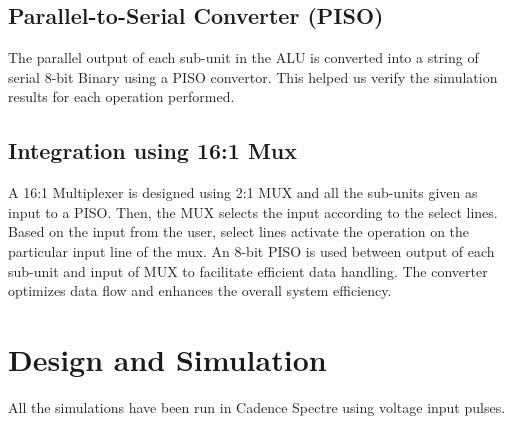 \documentclass[conference]{IEEEtran}
\begin{document}
\subsection{Parallel-to-Serial Converter (PISO)}\label{CC}
The parallel output of each sub-unit in the ALU is converted into a string of serial 8-bit Binary using a PISO convertor. This helped us verify the simulation results for each operation performed.

\subsection{Integration using 16:1 Mux}\label{CD}
A 16:1 Multiplexer is designed using 2:1 MUX and all the sub-units given as input to a PISO. Then, the MUX selects the input according to the select lines. Based on the input from the user, select lines activate the operation on the particular input line of the mux.
An 8-bit PISO is used between output of each sub-unit and input of MUX to facilitate efficient data handling. The converter optimizes data flow and enhances the overall system efficiency.
\\ 

\section{Design and Simulation}\label{D}
All the simulations have been run in Cadence Spectre using voltage input pulses.
\end{document}
